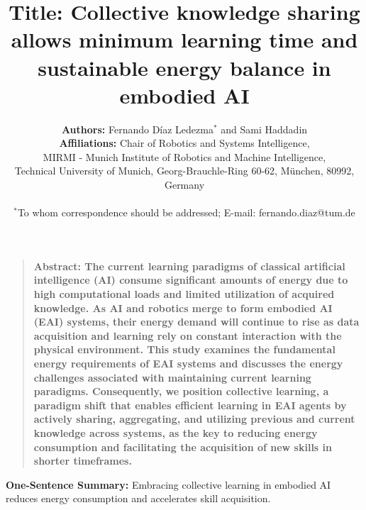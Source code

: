 \documentclass[12pt]{article}
\title{\textbf{Title:} Collective knowledge sharing allows minimum learning time and sustainable energy balance in embodied AI}
\author
{\textbf{Authors:} Fernando D\'iaz Ledezma$^{\ast}$ and Sami Haddadin
	\\
	\normalsize{\textbf{Affiliations:} Chair of Robotics and Systems Intelligence,}\\
	\normalsize{MIRMI - Munich Institute of Robotics and Machine Intelligence,}\\
	\normalsize{Technical University of Munich, Georg-Brauchle-Ring 60-62, M\"unchen, 80992, Germany}\\
	\\
	\normalsize{$^\ast$To whom correspondence should be addressed; E-mail: fernando.diaz@tum.de}
}
\date{}
\newenvironment{sciabstract}{%
\begin{quote} \bf}
{\end{quote}}
\begin{document}
 

\baselineskip24pt


\maketitle 



\begin{sciabstract}
	\textbf{Abstract:} The current learning paradigms of classical artificial intelligence (AI) consume significant amounts of energy due to high computational loads and limited utilization of acquired knowledge. As AI and robotics merge to form embodied AI (EAI) systems, their energy demand will continue to rise as data acquisition and learning rely on constant interaction with the physical environment. This study examines the fundamental energy requirements of EAI systems and discusses the energy challenges associated with maintaining current learning paradigms. Consequently, we position collective learning, a paradigm shift that enables efficient learning in EAI agents by actively sharing, aggregating, and utilizing previous and current knowledge across systems, as the key to reducing energy consumption and facilitating the acquisition of new skills in shorter timeframes.
\end{sciabstract}

\textbf{One-Sentence Summary:} Embracing collective learning in embodied AI reduces energy consumption and accelerates skill acquisition.

\end{document}

